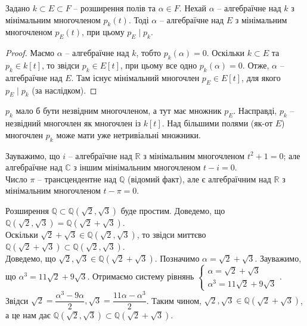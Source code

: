 \documentclass{math_library}
\begin{document}
\begin{proposition}
\label{algebraic_over_intermediate_field}
Задано $k \subset E \subset F$ -- розширення полів та $\alpha \in F$. Нехай $\alpha$ -- алгебраїчне над $k$ з мінімальним многочленом $p_k(t)$. Тоді $\alpha$ -- алгебраїчне над $E$ з мінімальним многочленом $p_E(t)$, при цьому $p_E \mid p_k$.
\end{proposition}

\begin{proof}
Маємо $\alpha$ -- алгебраїчне над $k$, тобто $p_k(\alpha) = 0$. Оскільки $k \subset E$ та $p_k \in k[t]$, то звідси $p_k \in E[t]$, при цьому все одно $p_k(\alpha) = 0$. Отже, $\alpha$ -- алгебраїчне над $E$. Там існує мінімальний многочлен $p_E \in E[t]$, для якого $p_E \mid p_k$ (за наслідком).
\end{proof}

\begin{remark}
$p_k$ мало б бути незвідним многочленом, а тут має множник $p_E$. Насправді, $p_k$ -- незвідний многочлен як многочлен із $k[t]$. Над більшими полями (як-от $E$) многочлен $p_k$ може мати уже нетривіальні множники.
\end{remark}

\begin{example}
Зауважимо, що $i$ -- алгебраїчне над $\mathbb{R}$ з мінімальним многочленом $t^2 + 1 = 0$; але алгебраїчне над $\mathbb{C}$ з іншим мінімальним многочленом $t - i = 0$.\\
Число $\pi$ -- трансцендентне над $\mathbb{Q}$ (відомий факт), але є алгебраїчним над $\mathbb{R}$ з мінімальним многочленом $t-\pi = 0$.
\end{example}

\begin{example}
Розширення $\mathbb{Q} \subset \mathbb{Q}(\sqrt{2},\sqrt{3})$ буде простим. Доведемо, що $\mathbb{Q}(\sqrt{2},\sqrt{3}) = \mathbb{Q}(\sqrt{2}+\sqrt{3})$.\\
Оскільки $\sqrt{2}+\sqrt{3} \in \mathbb{Q}(\sqrt{2},\sqrt{3})$, то звідси миттєво $\mathbb{Q}(\sqrt{2}+\sqrt{3}) \subset \mathbb{Q}(\sqrt{2},\sqrt{3})$.\\
Доведемо, що $\sqrt{2},\sqrt{3} \in \mathbb{Q}(\sqrt{2}+\sqrt{3})$. Позначимо $\alpha = \sqrt{2} + \sqrt{3}$. Зауважимо, що $\alpha^3 = 11 \sqrt{2} + 9 \sqrt{3}$. Отримаємо систему рівнянь $\begin{cases} \alpha = \sqrt{2} + \sqrt{3} \\ \alpha^3 = 11 \sqrt{2} + 9 \sqrt{3} \end{cases}$. Звідси $\sqrt{2} = \dfrac{\alpha^3 - 9 \alpha}{2}, \sqrt{3} = \dfrac{11\alpha - \alpha^3}{2}$. Таким чином, $\sqrt{2}, \sqrt{3} \in \mathbb{Q}(\sqrt{2}+\sqrt{3})$, а це нам дає $\mathbb{Q}(\sqrt{2},\sqrt{3}) \subset \mathbb{Q}(\sqrt{2}+\sqrt{3})$.
\end{example}
\end{document}
